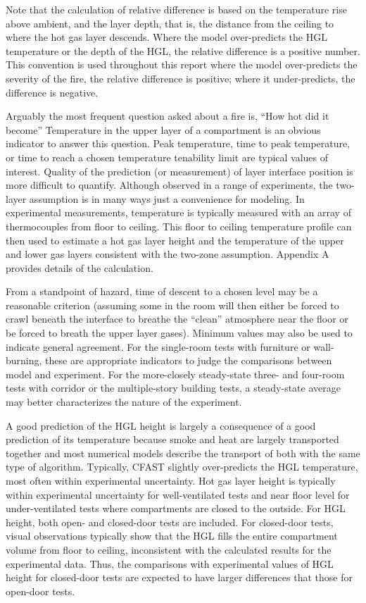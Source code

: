 Note that the calculation of relative difference is based on the temperature rise above ambient, and the layer depth, that is, the distance from the ceiling to where the hot gas layer descends.  Where the model over-predicts the HGL temperature or the depth of the HGL, the relative difference is a positive number. This convention is used throughout this report where the model over-predicts the severity of the fire, the relative difference is positive; where it under-predicts, the difference is negative.

Arguably the most frequent question asked about a fire is, ``How hot did it become''  Temperature in the upper layer of a compartment is an obvious indicator to answer this question.  Peak temperature, time to peak temperature, or time to reach a chosen temperature tenability limit are typical values of interest.  Quality of the prediction (or measurement) of layer interface position is more difficult to quantify.  Although observed in a range of experiments, the two-layer assumption is in many ways just a convenience for modeling.  In experimental measurements, temperature is typically measured with an array of thermocouples from floor to ceiling.  This floor to ceiling temperature profile can then used to estimate a hot gas layer height and the temperature of the upper and lower gas layers \cite{Janssens:1992} \cite{McGrattan:2003} consistent with the two-zone assumption. Appendix A provides details of the calculation.

From a standpoint of hazard, time of descent to a chosen level may be a reasonable criterion (assuming some in the room will then either be forced to crawl beneath the interface to breathe the ``clean'' atmosphere near the floor or be forced to breath the upper layer gases).  Minimum values may also be used to indicate general agreement.  For the single-room tests with furniture or wall-burning, these are appropriate indicators to judge the comparisons between model and experiment.  For the more-closely steady-state three- and four-room tests with corridor or the multiple-story building tests, a steady-state average may better characterizes the nature of the experiment.

A good prediction of the HGL height is largely a consequence of a good prediction of its temperature because smoke and heat are largely transported together and most numerical models describe the transport of both with the same type of algorithm.  Typically, CFAST slightly over-predicts the HGL temperature, most often within experimental uncertainty.  Hot gas layer height is typically within experimental uncertainty for well-ventilated tests and near floor level for under-ventilated tests where compartments are closed to the outside.  For HGL height, both open- and closed-door tests are included.  For closed-door tests, visual observations typically show that the HGL fills the entire compartment volume from floor to ceiling, inconsistent with the calculated results for the experimental data.  Thus, the comparisons with experimental values of HGL height for closed-door tests are expected to have larger differences that those for open-door tests.


